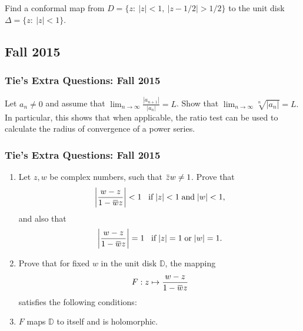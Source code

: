 Find a conformal map from \(D = \{z :\  |z| < 1,\ |z - 1/2| > 1/2\}\) to
the unit disk \(\Delta=\{z: \ |z|<1\}\).

\hypertarget{fall-2015}{%
\subsection{Fall 2015}\label{fall-2015}}

\hypertarget{ties-extra-questions-fall-2015}{%
\subsubsection{Tie's Extra Questions: Fall
2015}\label{ties-extra-questions-fall-2015}}

Let \(a_n \neq 0\) and assume that
\(\displaystyle \lim_{n \rightarrow \infty} \frac{|a_{n+1}|}{|a_n|} = L\).
Show that
\(\displaystyle \lim_{n \rightarrow \infty} \sqrt[n]{|a_n|} = L. %
\) In particular, this shows that when applicable, the ratio test can be
used to calculate the radius of convergence of a power series.

\hypertarget{ties-extra-questions-fall-2015-1}{%
\subsubsection{Tie's Extra Questions: Fall
2015}\label{ties-extra-questions-fall-2015-1}}

\begin{enumerate}
\def\labelenumi{(\alph{enumi})}
\item
  Let \(z, w\) be complex numbers, such that
  \(\mkern 1.5mu\overline{\mkern-1.5muz\mkern-1.5mu}\mkern 1.5mu w \neq 1\).
  Prove that
  \begin{align*}{\left\lvert {\frac{w - z}{1 - \mkern 1.5mu\overline{\mkern-1.5muw\mkern-1.5mu}\mkern 1.5mu z}} \right\rvert} < 1 \; \; \; \mbox{if} \; |z| < 1 \; \mbox{and}\; |w| < 1,\end{align*}
  and also that
  \begin{align*}{\left\lvert {\frac{w - z}{1 - \mkern 1.5mu\overline{\mkern-1.5muw\mkern-1.5mu}\mkern 1.5mu z}} \right\rvert} = 1 \; \; \; \mbox{if} \; |z| = 1 \; \mbox{or}\; |w| = 1.\end{align*}
\item
  Prove that for fixed \(w\) in the unit disk \(\mathbb D\), the mapping
  \begin{align*}F: z \mapsto \frac{w - z}{1 - \mkern 1.5mu\overline{\mkern-1.5muw\mkern-1.5mu}\mkern 1.5mu z}\end{align*}
  satisfies the following conditions:
\item
  \(F\) maps \(\mathbb D\) to itself and is holomorphic.~
\end{enumerate}

